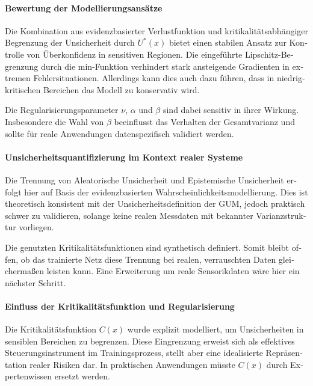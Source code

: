 \begin{otherlanguage}{ngerman}
\paragraph{Bewertung der Modellierungsansätze}

Die Kombination aus evidenzbasierter Verlustfunktion und kritikalitätsabhängiger Begrenzung der Unsicherheit durch $U^*(x)$ bietet einen stabilen Ansatz zur Kontrolle von Überkonfidenz in sensitiven Regionen. Die eingeführte Lipschitz-Begrenzung durch die min-Funktion verhindert stark ansteigende Gradienten in extremen Fehlersituationen.  Allerdings kann dies auch dazu führen, dass in niedrig-kritischen Bereichen das Modell zu konservativ wird.

Die Regularisierungsparameter $\nu$, $\alpha$ und $\beta$ sind dabei sensitiv in ihrer Wirkung. Insbesondere die Wahl von $\beta$ beeinflusst das Verhalten der Gesamtvarianz und sollte für reale Anwendungen datenspezifisch validiert werden.

\paragraph{Unsicherheitsquantifizierung im Kontext realer Systeme}

Die Trennung von \gls{Aleatorische Unsicherheit} und \gls{Epistemische Unsicherheit} erfolgt hier auf Basis der evidenzbasierten Wahrscheinlichkeitsmodellierung. Dies ist theoretisch konsistent mit der Unsicherheitsdefinition der GUM, jedoch praktisch schwer zu validieren, solange keine realen Messdaten mit bekannter Varianzstruktur vorliegen.

Die genutzten Kritikalitätsfunktionen sind synthetisch definiert. Somit bleibt offen, ob das trainierte Netz diese Trennung bei realen, verrauschten Daten gleichermaßen leisten kann. Eine Erweiterung um reale Sensorikdaten wäre hier ein nächster Schritt.

\paragraph{Einfluss der Kritikalitätsfunktion und Regularisierung}

Die Kritikalitätsfunktion $C(x)$ wurde explizit modelliert, um Unsicherheiten in sensiblen Bereichen zu begrenzen. Diese Eingrenzung erweist sich als effektives Steuerungsinstrument im Trainingsprozess, stellt aber eine idealisierte Repräsentation realer Risiken dar. In praktischen Anwendungen müsste $C(x)$ durch Expertenwissen ersetzt werden.


\end{otherlanguage}
